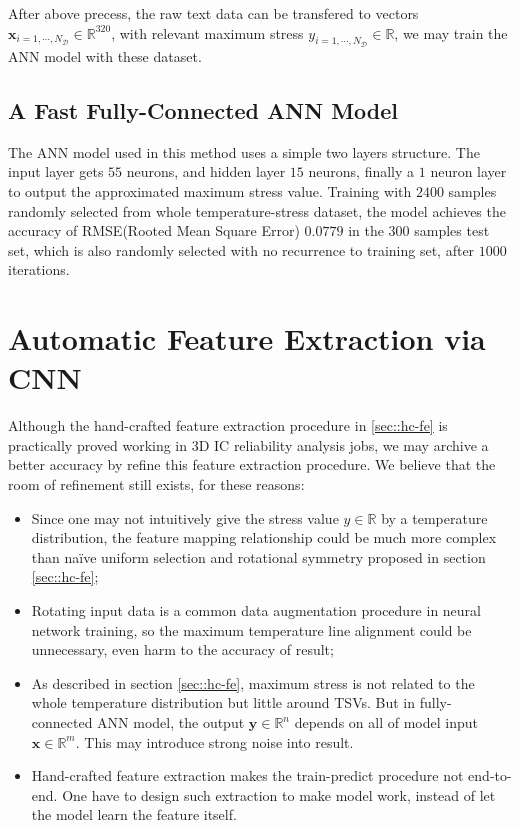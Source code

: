 After above precess, the raw text data can be transfered to vectors 
$\mathbf{x}_{i=1,\cdots,N_\mathcal{D}} \in \mathbb{R}^{320}$, 
with relevant maximum stress 
$y_{i=1,\cdots,N_\mathcal{D}} \in \mathbb{R}$,
we may train the ANN model with these dataset.

\subsection{A Fast Fully-Connected ANN Model}
The ANN model used in this method uses a simple two layers structure. 
The input layer gets $55$ neurons, and hidden layer $15$ neurons, finally a $1$ neuron layer
to output the approximated maximum stress value.
Training with $2400$ samples randomly selected from whole temperature-stress dataset,
the model achieves the accuracy of RMSE(Rooted Mean Square Error) $0.0779$ in the $300$ samples test set,
which is also randomly selected with no recurrence to training set, after $1000$ iterations.

\section{Automatic Feature Extraction via CNN}
Although the hand-crafted feature extraction procedure in \ref{sec::hc-fe} is 
practically proved working in 3D IC reliability analysis jobs,
we may archive a better accuracy by refine this feature extraction procedure.
We believe that the room of refinement still exists, for these reasons:
\begin{itemize}
    \item Since one may not intuitively give the stress value $y\in\mathbb{R}$
    by a temperature distribution, the feature mapping relationship could be
    much more complex than na\"ive uniform selection and rotational symmetry proposed
    in section \ref{sec::hc-fe};
    
    \item Rotating input data is a common data augmentation procedure in neural
    network training\cite{Goodfellow2016Deep}, 
    so the maximum temperature line alignment could be unnecessary,
    even harm to the accuracy of result;
    
    \item As described in section \ref{sec::hc-fe}, maximum stress is not related to
    the whole temperature distribution but little around TSVs. But in fully-connected
    ANN model, the output $\mathbf{y}\in\mathbb{R}^n$ depends on all of model input 
    $\mathbf{x}\in\mathbb{R}^m$. This may introduce strong noise into result.
    
    \item Hand-crafted feature extraction makes the train-predict procedure not
    end-to-end. One have to design such extraction to make model work, instead of
    let the model learn the feature itself.
\end{itemize}

